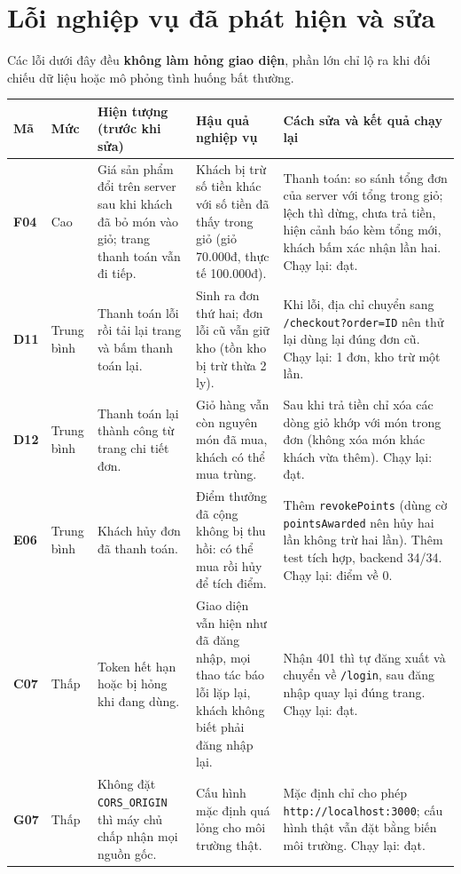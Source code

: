 \documentclass[a4paper,11pt]{article}
\begin{document}
\section{Lỗi nghiệp vụ đã phát hiện và sửa}\label{sec:bugs}
Các lỗi dưới đây đều \textbf{không làm hỏng giao diện}, phần lớn chỉ lộ ra khi đối chiếu dữ liệu hoặc mô phỏng tình huống bất thường.
\begin{longtable}{|L{0.9cm}|L{1.2cm}|L{3.3cm}|L{3.9cm}|L{4.0cm}|}\hline
\textbf{Mã}&\textbf{Mức}&\textbf{Hiện tượng (trước khi sửa)}&\textbf{Hậu quả nghiệp vụ}&\textbf{Cách sửa và kết quả chạy lại}\\\hline\endhead
\textbf{F04}&Cao&Giá sản phẩm đổi trên server sau khi khách đã bỏ món vào giỏ; trang thanh toán vẫn đi tiếp.&Khách bị trừ số tiền khác với số tiền đã thấy trong giỏ (giỏ 70.000đ, thực tế 100.000đ).&Thanh toán: so sánh tổng đơn của server với tổng trong giỏ; lệch thì dừng, chưa trả tiền, hiện cảnh báo kèm tổng mới, khách bấm xác nhận lần hai. Chạy lại: đạt.\\\hline
\textbf{D11}&Trung bình&Thanh toán lỗi rồi tải lại trang và bấm thanh toán lại.&Sinh ra đơn thứ hai; đơn lỗi cũ vẫn giữ kho (tồn kho bị trừ thừa 2 ly).&Khi lỗi, địa chỉ chuyển sang \texttt{/checkout?order=ID} nên thử lại dùng lại đúng đơn cũ. Chạy lại: 1 đơn, kho trừ một lần.\\\hline
\textbf{D12}&Trung bình&Thanh toán lại thành công từ trang chi tiết đơn.&Giỏ hàng vẫn còn nguyên món đã mua, khách có thể mua trùng.&Sau khi trả tiền chỉ xóa các dòng giỏ khớp với món trong đơn (không xóa món khác khách vừa thêm). Chạy lại: đạt.\\\hline
\textbf{E06}&Trung bình&Khách hủy đơn đã thanh toán.&Điểm thưởng đã cộng không bị thu hồi: có thể mua rồi hủy để tích điểm.&Thêm \texttt{revokePoints} (dùng cờ \texttt{pointsAwarded} nên hủy hai lần không trừ hai lần). Thêm test tích hợp, backend 34/34. Chạy lại: điểm về 0.\\\hline
\textbf{C07}&Thấp&Token hết hạn hoặc bị hỏng khi đang dùng.&Giao diện vẫn hiện như đã đăng nhập, mọi thao tác báo lỗi lặp lại, khách không biết phải đăng nhập lại.&Nhận 401 thì tự đăng xuất và chuyển về \texttt{/login}, sau đăng nhập quay lại đúng trang. Chạy lại: đạt.\\\hline
\textbf{G07}&Thấp&Không đặt \texttt{CORS\_ORIGIN} thì máy chủ chấp nhận mọi nguồn gốc.&Cấu hình mặc định quá lỏng cho môi trường thật.&Mặc định chỉ cho phép \texttt{http://localhost:3000}; cấu hình thật vẫn đặt bằng biến môi trường. Chạy lại: đạt.\\\hline
\end{longtable}
\end{document}
